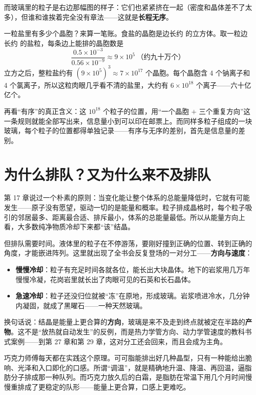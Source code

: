 而玻璃里的粒子是右边那幅图的样子：它们也紧紧挤在一起（密度和晶体差不了太多），但谁和谁挨着完全没有章法——这就是\textbf{长程无序}。

\begin{qiaoliang}
一粒盐里有多少个晶胞？来算一笔账。食盐的晶胞是边长约  的立方体。取一粒边长约  的盐粒，每条边上能排的晶胞数是
\[
\frac{0.5\times 10^{-3}}{0.56\times 10^{-9}} \approx 9\times 10^{5}\ \text{（约九十万个）}
\]
立方之后，整粒盐约有 $(9\times 10^{5})^{3} \approx 7\times 10^{17}$ 个晶胞。每个晶胞含 4 个钠离子和 4 个氯离子，所以这粒肉眼几乎看不清的盐里，大约有 $6\times 10^{18}$ 个离子——六十亿亿个。

再看“有序”的真正含义：这 $10^{18}$ 个粒子的位置，用“一个晶胞 $+$ 三个重复方向”这一条规则就能全部写出来，信息量小到可以印在邮票上。而同样多粒子组成的一块玻璃，每个粒子的位置都得单独记录——有序与无序的差别，首先是信息量的差别。
\end{qiaoliang}

\section{为什么排队？又为什么来不及排队}

第 17 章说过一个朴素的原则：当变化能让整个体系的总能量降低时，它就有可能发生——原子没有愿望，驱动一切的是能量和概率。粒子排成晶格时，每个粒子吸引的邻居最多、距离最合适、排斥最小，体系的总能量最低。所以从能量方向上看，大多数纯净物质冷却下来都“该”结晶。

但排队需要时间。液体里的粒子在不停游荡，要刚好撞到正确的位置、转到正确的角度，才能嵌进阵列。这里就出现了全书会反复登场的一对分工——\textbf{方向与速度}：

\begin{itemize}[itemsep=2pt]
\item \textbf{慢慢冷却}：粒子有充足时间各就各位，能长出大块晶体。地下的岩浆用几万年慢慢冷凝，花岗岩里就长出了肉眼可见的石英和长石晶体。
\item \textbf{急速冷却}：粒子还没归位就被“冻”在原地，形成玻璃。岩浆喷进冷水，几分钟内凝固，就成了黑曜石——一种天然玻璃。
\end{itemize}

换句话说：结晶是能量上更合算的\textbf{方向}，玻璃是来不及走到终点就被定在半路的\textbf{产物}。这不是“放热就自动发生”的反例，而是热力学管方向、动力学管速度的教科书式案例——到第 27 章和第 29 章，这对分工还会回来，而且会成为主角。

巧克力师傅每天都在实践这个原理。可可脂能排出好几种晶型，只有一种能给出脆响、光泽和入口即化的口感。所谓“调温”，就是精确地升温、降温、再回温，逼脂肪分子排成那一种队列。而巧克力放久后的白霜，是脂肪在常温下用几个月时间慢慢重排成了更稳定的队形——能量上更合算，口感上更难吃。

